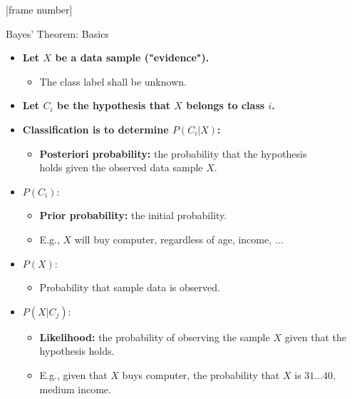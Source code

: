\documentclass[aspectratio=169,t,table]{beamer}
\begin{document}
  {
    [frame number]
    \begin{frame}{Bayes' Theorem: Basics}
        \begin{itemize}
          \item \textbf{Let $X$ be a data sample ("evidence").}
          \begin{itemize}
            \item The class label shall be unknown.
          \end{itemize}
          \item \textbf{Let $C_i$ be the hypothesis that $X$ belongs to class $i$.}
          \item \textbf{Classification is to determine $P(C_i|X)$:}
          \begin{itemize}
            \item \textbf{\color{airforceblue}Posteriori probability:} the probability that the hypothesis \\ holds given the observed data sample $X$.
          \end{itemize}
          \item $P(C_i)$:
          \begin{itemize}
            \item \textbf{\color{airforceblue}Prior probability:} the initial probability.
            \item E.g., $X$ will buy computer, regardless of age, income, $\ldots$
          \end{itemize}
          \item $P(X)$:
          \begin{itemize}
            \item Probability that sample data is observed.
          \end{itemize}
          \item $P(X|C_j)$:
          \begin{itemize}
            \item \textbf{\color{airforceblue}Likelihood:} the probability of observing the sample $X$ given that the hypothesis holds.
            \item E.g., given that $X$ buys computer, the probability that $X$ is $31\ldots40$, medium income.
          \end{itemize}
        \end{itemize}
    \end{frame}
  }
\end{document}

